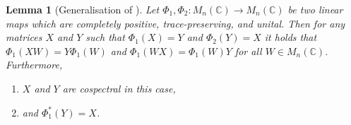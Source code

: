\documentclass[11pt,a4paper]{article}
\theoremstyle{plain}
\newtheorem{lem}[thm]{Lemma}
\theoremstyle{remark}
\theoremstyle{definition}
\begin{document}
\begin{lem}[Generalisation of {\cite[Lemma 4.9]{david_mathprog}}]
  \label{lem:lingalg_series}
  Let $\Phi_1, \Phi_2\colon M_n(\mathbb{C}) \to M_n(\mathbb{C})$ be two linear maps which are completely positive, trace-preserving, and unital.
  Then for any matrices $X$ and $Y$ such that $\Phi_1(X) = Y$ and $\Phi_2(Y) = X$ it holds that $\Phi_1(XW) = Y\Phi_1(W)$ and $\Phi_1(WX) = \Phi_1(W)Y$ for all $W \in M_n(\mathbb{C})$. Furthermore, 
  
  \begin{enumerate}[label = \roman*.]
      \item $X$ and $Y$ are cospectral in this case,
      \item and $\Phi_1^*(Y) = X$. 
  \end{enumerate}
\end{lem}
\end{document}
